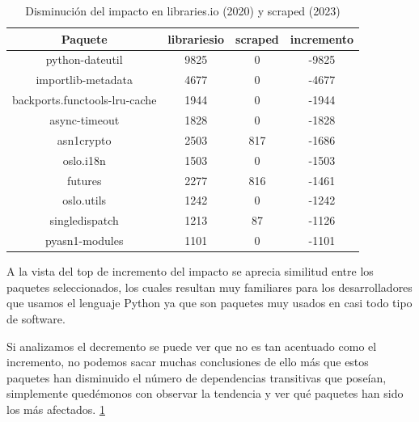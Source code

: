 \begin{table}[ht!]
    \centering
    \label{tab:Disminución del impacto en libraries.io y scraped}
    \begin{tabular}{|c|c|c|c|}
        \hline
        \textbf{Paquete}              & \textbf{librariesio} & \textbf{scraped} & \textbf{incremento} \\
        \hline
        python-dateutil               & 9825                 & 0                & -9825               \\
        importlib-metadata            & 4677                 & 0                & -4677               \\
        backports.functools-lru-cache & 1944                 & 0                & -1944               \\
        async-timeout                 & 1828                 & 0                & -1828               \\
        asn1crypto                    & 2503                 & 817              & -1686               \\
        oslo.i18n                     & 1503                 & 0                & -1503               \\
        futures                       & 2277                 & 816              & -1461               \\
        oslo.utils                    & 1242                 & 0                & -1242               \\
        singledispatch                & 1213                 & 87               & -1126               \\
        pyasn1-modules                & 1101                 & 0                & -1101               \\
        \hline
    \end{tabular}
    \caption{Disminución del impacto en libraries.io (2020) y scraped (2023)}
\end{table}

A la vista del top de incremento del impacto se aprecia similitud entre los paquetes seleccionados,
los cuales resultan muy familiares para los desarrolladores que usamos el lenguaje Python ya que
son paquetes muy usados en casi todo tipo de software.

Si analizamos el decremento se puede ver que no es tan acentuado como el incremento, no
podemos sacar muchas conclusiones de ello más que estos paquetes han disminuido el número de
dependencias transitivas que poseían, simplemente quedémonos con observar la tendencia y ver qué
paquetes han sido los más afectados. \ref{tab:Disminución del impacto en libraries.io y scraped}


